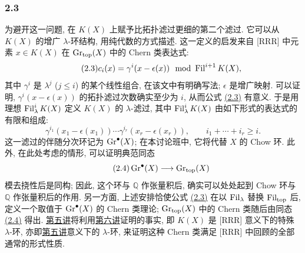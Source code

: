 \subsubsection*{2.3}
为避开这一问题, 在 $K(X)$ 上赋予比拓扑滤过更细的第二个滤过. 它可以从 $K(X)$ 的增广 $\lambda$-环结构, 用纯代数的方式描述. 这一定义的启发来自 [RRR] 中元素 $x\in K(X)$ 在 $\operatorname{Gr}_{\mathrm{top}}(X)$ 中的 Chern 类表达式:
\begin{equation}\tag{2.3}
c_i(x)=\gamma^i(x-\epsilon(x))\mod {\operatorname{Fil}}^{i+1}K(X),
\end{equation}
其中 $\gamma^i$ 是 $\lambda^j$ ($j\le i$) 的某个线性组合, 在该文中有明确写法; $\epsilon$ 是增广映射. 可以证明, $\gamma^i(x-\epsilon(x))$ 的拓扑滤过次数确实至少为 $i$, 从而公式 \hyperlink{sga6.e00.eq.2-3}{(2.3)} 有意义. 于是用理想 $\operatorname{Fil}^i_\lambda K(X)$ 定义 $K(X)$ 的 $\lambda$-滤过, 其中 $\operatorname{Fil}^i_\lambda K(X)$ 由如下形式的表达式的有限和组成:
\[
\gamma^{i_1}(x_1-\epsilon(x_1))\cdots \gamma^{i_r}(x_r-\epsilon(x_r)),\qquad i_1+\cdots+i_r\ge i.
\]
这一滤过的伴随分次环记为 $\operatorname{Gr}^\bullet(X)$; 在本讨论班中, 它将代替 $X$ 的 Chow 环. 此外, 在此处考虑的情形, 可以证明典范同态
\begin{equation}\tag{2.4}
\operatorname{Gr}^\bullet(X)\longrightarrow \operatorname{Gr}_{\mathrm{top}}(X)
\end{equation}
模去挠性后是同构; 因此, 这个环与 $\mathbb Q$ 作张量积后, 确实可以处处起到 Chow 环与 $\mathbb Q$ 作张量积后的作用. 另一方面, 上述安排恰使公式 \hyperlink{sga6.e00.eq.2-3}{(2.3)} 在以 $\operatorname{Fil}_\lambda$ 替换 $\operatorname{Fil}_{\mathrm{top}}$ 后, 定义一个取值于 $\operatorname{Gr}^\bullet(X)$ 的 Chern 类理论; $\operatorname{Gr}_{\mathrm{top}}(X)$ 中的 Chern 类随后由同态 \hyperlink{sga6.e00.eq.2-4}{(2.4)} 得出. \hyperlink{sga6.e05.expose}{第五讲}将利用\hyperlink{sga6.e06.expose}{第六讲}证明的事实, 即 $K(X)$ 是 [RRR] 意义下的特殊 $\lambda$-环, 亦即\hyperlink{sga6.e05.expose}{第五讲}意义下的 $\lambda$-环, 来证明这种 Chern 类满足 [RRR] 中回顾的全部通常的形式性质.

